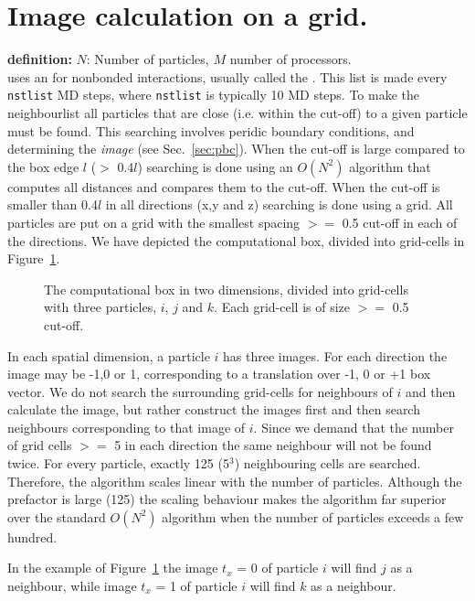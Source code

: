 \newcommand{\nproc}{\mbox{$M$}}
\newcommand{\natom}{\mbox{$N$}}

\section{Image calculation on a grid.}
\label{sec:nsgrid}
{\bf definition:} {\natom}: Number of particles, {\nproc} number of processors.\\
{\gromacs} uses an  for nonbonded interactions,
usually called the {\em {}}.
This list is made every {\tt nstlist} MD steps, where {\tt nstlist} is
typically 10 MD steps. 
To make the neighbourlist all particles that are close 
(i.e. within the cut-off) to a given particle must be found.
This searching involves peridic boundary conditions, and 
determining the {\em image} (see Sec.~\ref{sec:pbc}).
When the cut-off is large compared to the box edge $l$ ($>$ 0.4$l$)
searching is done using an $O({\natom}^2)$ algorithm that computes
all distances and compares them to the cut-off.
When the cut-off is smaller than 0.4$l$ in all directions (x,y and z)
searching is done using a grid. All particles are put on a grid
with the smallest spacing  $>=$ 0.5 cut-off in each of the directions.
We have depicted the computational box, divided into grid-cells in 
Figure~\ref{fig:nsgrid}.
\begin{figure}[ht]
\centerline{}
\caption{The computational box in two dimensions, divided into grid-cells with three particles, $i$, $j$ and $k$. Each grid-cell is of size $>=$ 0.5 cut-off.}
\label{fig:nsgrid}
\end{figure}
In each spatial dimension, a particle $i$ has three images. For each direction
the image may be -1,0 or 1, corresponding to a translation over -1, 0 or +1
box vector. We do not search the surrounding grid-cells for
neighbours of $i$ and then calculate the image, 
but rather construct the images first and then 
search neighbours corresponding to that image of $i$.
Since we demand that the number of grid cells $>=$ 5 in each direction 
the same neighbour will not be found twice. For every particle, exactly 125 (5$^3$)
neighbouring cells are searched. Therefore, the algorithm scales linear with the 
number of particles. Although the prefactor is large (125) the scaling behaviour
makes the algorithm far superior over the standard $O({\natom}^2)$ 
algorithm when the 
number of particles exceeds a few hundred.

In the example of Figure~\ref{fig:nsgrid} the image $t_x$ = 0 of particle
$i$ will find $j$ as a neighbour, while image $t_x$ = 1 of particle $i$
will find $k$ as a neighbour.


